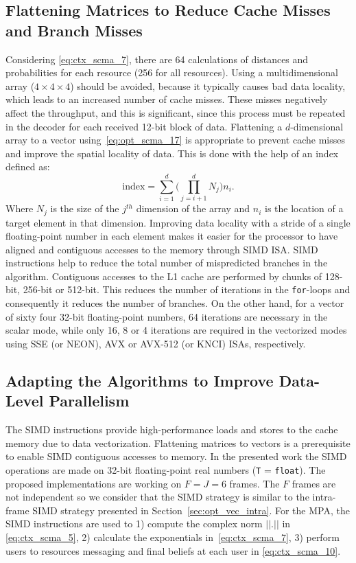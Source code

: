 \subsection{Flattening Matrices to Reduce Cache Misses and Branch Misses}
\label{sec:opt_scma_flattening}

Considering \eqref{eq:ctx_scma_7}, there are 64 calculations of distances and
probabilities for each resource (256 for all resources). Using a
multidimensional array ($4\times4\times4$) should be avoided, because it
typically causes bad data locality, which leads to an increased number of cache
misses. These misses negatively affect the throughput, and this is significant,
since this process must be repeated in the decoder for each received 12-bit
block of data. Flattening a $d$-dimensional array to a vector
using~\eqref{eq:opt_scma_17} is appropriate to prevent cache misses and improve
the spatial locality of data. This is done with the help of an index defined as:
\begin{equation}
  \label{eq:opt_scma_17}
  \text{index} = \sum\limits_{i=1}^d\Bigg( \prod\limits_{j=i+1}^d N_j \Bigg)n_i.
\end{equation}
Where $N_j$ is the size of the $j^{th}$ dimension of the array and $n_i$ is the
location of a target element in that dimension. Improving data locality with
a stride of a single floating-point number in each element makes it easier for
the processor to have aligned and contiguous accesses to the memory through SIMD
ISA. SIMD instructions help to reduce the total number of mispredicted branches
in the algorithm. Contiguous accesses to the L1 cache are performed by chunks of
128-bit, 256-bit or 512-bit. This reduces the number of iterations in the
\verb|for|-loops and consequently it reduces the number of branches. On the
other hand, for a vector of sixty four 32-bit floating-point numbers, 64
iterations are necessary in the scalar mode, while only 16, 8 or 4 iterations
are required in the vectorized modes using SSE (or NEON), AVX or
AVX-512 (or KNCI) ISAs, respectively.

\subsection{Adapting the Algorithms to Improve Data-Level Parallelism}
\label{sec:opt_scma_adapting_algorithms}

The SIMD instructions provide high-performance loads and stores to the cache
memory due to data vectorization. Flattening matrices to vectors is a
prerequisite to enable SIMD contiguous accesses to memory. In the presented work
the SIMD operations are made on 32-bit floating-point real numbers (\verb|T| =
\verb|float|). The proposed implementations are working on $F = J = 6$ frames.
The $F$ frames are not independent so we consider that the SIMD strategy is
similar to the intra-frame SIMD strategy presented in
Section~\ref{sec:opt_vec_intra}. For the MPA, the SIMD instructions are used to
1) compute the complex norm $||.||$ in \eqref{eq:ctx_scma_5}, 2) calculate the
exponentials in~\eqref{eq:ctx_scma_7}, 3) perform users to resources messaging
and final beliefs at each user in \eqref{eq:ctx_scma_10}.

